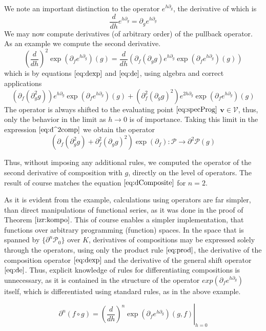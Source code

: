\documentclass[smallcondensed]{svjour3}
\newcommand{\VV}{\mathcal{V}}
\newcommand{\vv}{\mathbf{v}}
\newcommand{\dP}{\mathcal{P}}
\newcommand{\D}{\partial}
\begin{document}
 We note an important distinction to the operator $e^{h\D_g}$, the derivative of which is
 \begin{equation}\label{eq:de}
\frac{d}{dh}e^{h\D_g}=\D_ge^{h\D_g}
 \end{equation}
 We may now compute derivatives (of arbitrary order) of the pullback operator. As an example we compute the second derivative.
 $$\left(\frac{d}{dh}\right)^2\exp\left(\D_fe^{h\D_g}\right)(g)=\frac{d}{dh}\left(\D_f(\D_gg)e^{h\D_g}\exp\left(\D_fe^{h\D_g}\right)(g)\right)$$
 which is by equations $\eqref{eq:dexp}$ and $\eqref{eq:de}$, using algebra and correct applications
 \begin{equation}\label{eq:d^2comp}
 \left(\D_f(\D^2_gg)\right)e^{h\D_g}\exp(\D_fe^{h\D_g})(g)+(\D^2_f(\D_gg)^2)e^{2h\D_g}\exp(\D_fe^{h\D_g})(g)
 \end{equation}
 The operator is always shifted to the evaluating point $\eqref{eq:specProg}$ $\vv\in \VV$, thus, only the behavior in the limit as $h\to 0$ is of importance. Taking this limit in the expression $\eqref{eq:d^2comp}$ we obtain the operator
 \begin{equation}
	\left(\D_f(\D^2_gg)+\D^2_f(\D_gg)^2\right)\exp(\D_f):\dP\to\D^2\dP(g)
 \end{equation}
 
 Thus, without imposing any additional rules, we computed the operator of the second derivative of composition with $g$, directly on the level of operators. The result of course matches the equation $\eqref{eq:dComposite}$ for $n=2$.
 
 As it is evident from the example, calculations using operators are far
 simpler, than direct manipulations of functional series, as it was done in the
 proof of Theorem $\ref{izr:kompo}$. This of course enables a simpler
 implementation, that functions over arbitrary programming (function) spaces. In
 the space that is spanned by $\{\D^n\dP_0\}$ over $K$, derivatives of
 compositions may be expressed solely through the operators, using only the
 product rule $\eqref{eq:prod}$, the derivative of the composition operator
 $\eqref{eq:dexp}$ and the derivative of the general shift operator
 $\eqref{eq:de}$. Thus, explicit knowledge of rules for differentiating
 compositions is unnecessary, as it is contained in the structure of the
 operator $exp(\D_fe^{h\D_g})$ itself, which is differentiated using standard
 rules, as in the above example. 
 
 \begin{equation}\label{eq:dkompo}
 \D^n(f\circ g)=\left.\left(\frac{d}{dh}\right)^n\exp\left(\D_fe^{h\D_g}\right)(g,f)\right|_{h=0}
 \end{equation}
 
\end{document}
